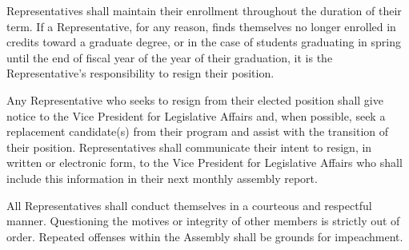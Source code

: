 \begin{bylaws-number}
  \item Representatives shall maintain their enrollment throughout the duration of their term. If a Representative, for any reason, finds themselves no longer enrolled in credits toward a graduate degree, or in the case of students graduating in spring until the end of fiscal year of the year of their graduation, it is the Representative’s responsibility to resign their position.
  \item Any Representative who seeks to resign from their elected position shall give notice to the Vice President for Legislative Affairs and, when possible, seek a replacement candidate(s) from their program and assist with the transition of their position. Representatives shall communicate their intent to resign, in written or electronic form, to the Vice President for Legislative Affairs who shall include this information in their next monthly assembly report.
  \item All Representatives shall conduct themselves in a courteous and respectful manner. Questioning the motives or integrity of other members is strictly out of order. Repeated offenses within the Assembly shall be grounds for impeachment.
\end{bylaws-number}


